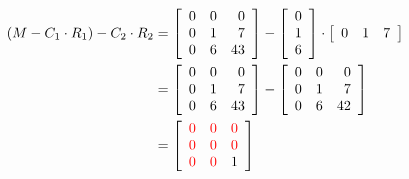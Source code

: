    \begin{align*} 
\left(M - C_1 \cdot R_1 \right)  -  C_2 \cdot R_2 &= \left[\begin{array}{rrr} 
       0  &   0  &   0 \\
     0   &  1   &  7 \\
     0   &  6   & 43 \end{array}  \right] -  \left[\begin{array}{r} 
    0  \\ 1 \\ 6  \end{array}  \right] \cdot \left[\begin{array}{rrr} 
   0   &  1   &  7 \end{array}  \right] \\
     &=\left[\begin{array}{rrr} 
       0  &   0  &   0 \\
     0   &  1   &  7 \\
     0   &  6   & 43 \end{array}  \right] -\left[\begin{array}{rrr} 
       0  &   0  &   0 \\
     0   &  1   &  7 \\
     0   &  6   & 42 \end{array}  \right]\\
     &=\left[\begin{array}{rrr} 
      \color{red}   0  &   \color{red}  0  &   \color{red}  0 \\
     \color{red}  0   &  \color{red}  0   &  \color{red}  0 \\
    \color{red}   0   &  \color{red}  0   & 1 \end{array}  \right]
\end{align*}
     
